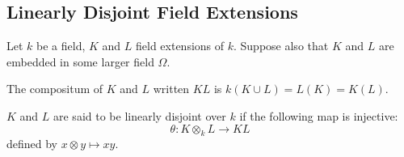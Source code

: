 \subsection{Linearly Disjoint Field Extensions}
Let $k$ be a field, $K$ and $L$ field extensions of $k$. Suppose also that $K$
and $L$ are embedded in some larger field $\Omega$.

\begin{definition} The compositum of $K$ and $L$ written $KL$ is $k(K\cup
L)=L(K)=K(L)$.
\end{definition}



\begin{definition} $K$ and $L$ are said to be linearly disjoint over $k$ if the
following map is injective:
\begin{equation} \theta: K\otimes_k L\rightarrow KL \end{equation} defined by
$x\otimes y\mapsto xy$.
\end{definition}








